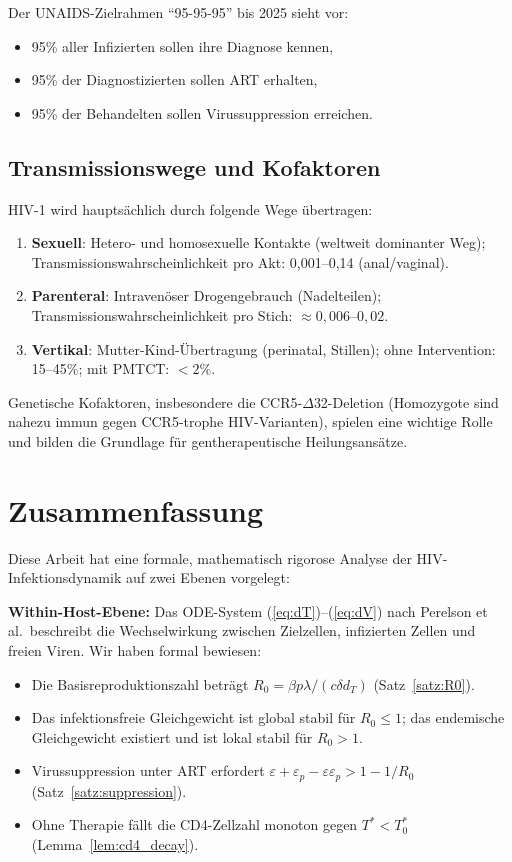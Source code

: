 ﻿\documentclass[a4paper,12pt]{article}
\theoremstyle{definition}
\begin{document}
Der UNAIDS-Zielrahmen ``95-95-95'' bis 2025 sieht vor:
\begin{itemize}
\item 95\% aller Infizierten sollen ihre Diagnose kennen,
\item 95\% der Diagnostizierten sollen ART erhalten,
\item 95\% der Behandelten sollen Virussuppression erreichen.
\end{itemize}

\subsection{Transmissionswege und Kofaktoren}

HIV-1 wird haupts\"achlich durch folgende Wege \"ubertragen:
\begin{enumerate}
\item \textbf{Sexuell}: Hetero- und homosexuelle Kontakte (weltweit dominanter Weg);
      Transmissionswahrscheinlichkeit pro Akt: 0{,}001--0{,}14 (anal/vaginal).
\item \textbf{Parenteral}: Intravenöser Drogengebrauch (Nadelteilen);
      Transmissionswahrscheinlichkeit pro Stich: $\approx 0{,}006$--$0{,}02$.
\item \textbf{Vertikal}: Mutter-Kind-\"Ubertragung (perinatal, Stillen);
      ohne Intervention: 15--45\%; mit PMTCT: $< 2\%$.
\end{enumerate}

Genetische Kofaktoren, insbesondere die CCR5-$\Delta$32-Deletion (Homozygote
sind nahezu immun gegen CCR5-trophe HIV-Varianten), spielen eine wichtige Rolle
und bilden die Grundlage f\"ur gentherapeutische Heilungsans\"atze.

\section{Zusammenfassung}

Diese Arbeit hat eine formale, mathematisch rigorose Analyse der HIV-Infektionsdynamik
auf zwei Ebenen vorgelegt:

\textbf{Within-Host-Ebene:} Das ODE-System (\ref{eq:dT})--(\ref{eq:dV}) nach Perelson
et al.\ beschreibt die Wechselwirkung zwischen Zielzellen, infizierten Zellen und
freien Viren. Wir haben formal bewiesen:
\begin{itemize}
\item Die Basisreproduktionszahl betr\"agt $R_0 = \beta p \lambda / (c \delta d_T)$
      (Satz~\ref{satz:R0}).
\item Das infektionsfreie Gleichgewicht ist global stabil f\"ur $R_0 \leq 1$;
      das endemische Gleichgewicht existiert und ist lokal stabil f\"ur $R_0 > 1$.
\item Virussuppression unter ART erfordert $\varepsilon + \varepsilon_p - \varepsilon\varepsilon_p > 1 - 1/R_0$
      (Satz~\ref{satz:suppression}).
\item Ohne Therapie f\"allt die CD4-Zellzahl monoton gegen $T^* < T_0^*$
      (Lemma~\ref{lem:cd4_decay}).
\end{itemize}
\end{document}
